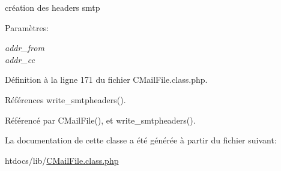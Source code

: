 cr\'{e}ation des headers smtp 

\begin{Desc}
\item[Param\`{e}tres:]
\begin{description}
\item[{\em addr\_\-from}]\item[{\em addr\_\-cc}]\end{description}
\end{Desc}


D\'{e}finition \`{a} la ligne 171 du fichier CMail\-File.class.php.

R\'{e}f\'{e}rences write\_\-smtpheaders().

R\'{e}f\'{e}renc\'{e} par CMail\-File(), et write\_\-smtpheaders().

La documentation de cette classe a \'{e}t\'{e} g\'{e}n\'{e}r\'{e}e \`{a} partir du fichier suivant:\begin{CompactItemize}
\item 
htdocs/lib/\hyperlink{CMailFile_8class_8php}{CMail\-File.class.php}\end{CompactItemize}
